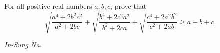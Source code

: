 For all positive real numbers $a,b,c$, prove that \[\sqrt{\frac{a^4 + 2b^2c^2}{a^2+2bc}} + \sqrt{\frac{b^4+2c^2a^2}{b^2+2ca}} + \sqrt{\frac{c^4 + 2a^2b^2}{c^2 + 2ab}} \geq a + b + c.\]

\textit{In-Sung Na.}
